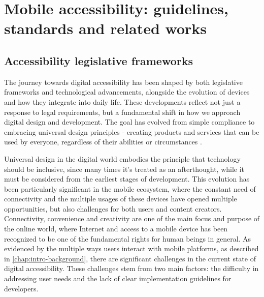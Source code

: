 \chapter{Mobile accessibility: guidelines, standards and related works}
\label{chap:accessibility}


\section{Accessibility legislative frameworks}
\label{chap:accessibility-history-rules}

The journey towards digital accessibility has been shaped by both legislative frameworks and technological advancements, alongside the evolution of devices and how they integrate into daily life. These developments reflect not just a response to legal requirements, but a fundamental shift in how we approach digital design and development. The goal has evolved from simple compliance to embracing universal design principles - creating products and services that can be used by everyone, regardless of their abilities or circumstances \cite{article:universal-design}.

Universal design in the digital world embodies the principle that technology should be inclusive, since many times it's treated as an afterthought, while it must be considered from the earliest stages of development. This evolution has been particularly significant in the mobile ecosystem, where the constant need of connectivity and the multiple usages of these devices have opened multiple opportunities, but also challenges for both users and content creators. Connectivity, convenience and creativity are one of the main focus and purpose of the online world, where Internet and access to a mobile device has been recognized to be one of the fundamental rights for human beings in general. As evidenced by the multiple ways users interact with mobile platforms, as described in \ref{chap:intro-background}, there are significant challenges in the current state of digital accessibility. These challenges stem from two main factors: the difficulty in addressing user needs and the lack of clear implementation guidelines for developers. \\

